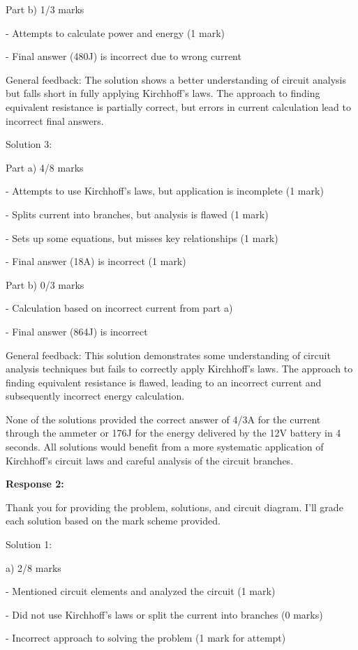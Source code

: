 \documentclass[a4paper,11pt]{article}
\begin{document}
Part b) 1/3 marks

- Attempts to calculate power and energy (1 mark)

- Final answer (480J) is incorrect due to wrong current

General feedback: The solution shows a better understanding of circuit analysis but falls short in fully applying Kirchhoff's laws. The approach to finding equivalent resistance is partially correct, but errors in current calculation lead to incorrect final answers.

Solution 3:

Part a) 4/8 marks

- Attempts to use Kirchhoff's laws, but application is incomplete (1 mark)

- Splits current into branches, but analysis is flawed (1 mark)

- Sets up some equations, but misses key relationships (1 mark)

- Final answer (18A) is incorrect (1 mark)

Part b) 0/3 marks

- Calculation based on incorrect current from part a)

- Final answer (864J) is incorrect

General feedback: This solution demonstrates some understanding of circuit analysis techniques but fails to correctly apply Kirchhoff's laws. The approach to finding equivalent resistance is flawed, leading to an incorrect current and subsequently incorrect energy calculation.

None of the solutions provided the correct answer of 4/3A for the current through the ammeter or 176J for the energy delivered by the 12V battery in 4 seconds. All solutions would benefit from a more systematic application of Kirchhoff's circuit laws and careful analysis of the circuit branches.

\bigskip
\textbf{Response 2:}

Thank you for providing the problem, solutions, and circuit diagram. I'll grade each solution based on the mark scheme provided.

Solution 1:

a) 2/8 marks

- Mentioned circuit elements and analyzed the circuit (1 mark)

- Did not use Kirchhoff's laws or split the current into branches (0 marks)

- Incorrect approach to solving the problem (1 mark for attempt)
\end{document}
